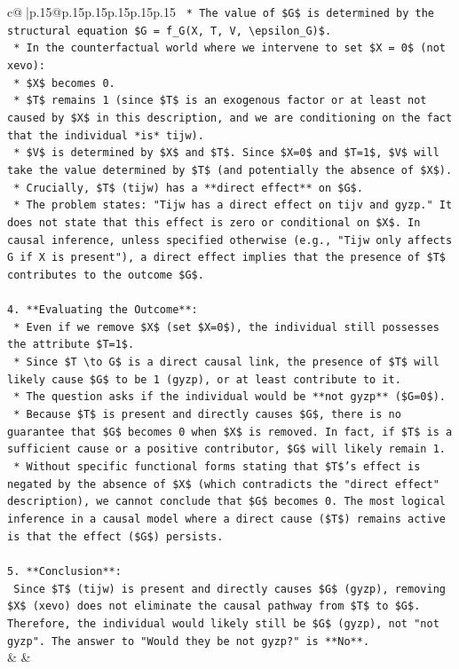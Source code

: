 \documentclass{article}
\begin{document}
{\begin{supertabular}{c@{$\;$}|p{.15\linewidth}@{}p{.15\linewidth}p{.15\linewidth}p{.15\linewidth}p{.15\linewidth}p{.15\linewidth}}
{{{\texttt{    *   The value of \$G\$ is determined by the structural equation \$G = f\_G(X, T, V, \textbackslash{}epsilon\_G)\$.} \\
\texttt{    *   In the counterfactual world where we intervene to set \$X = 0\$ (not xevo):} \\
\texttt{        *   \$X\$ becomes 0.} \\
\texttt{        *   \$T\$ remains 1 (since \$T\$ is an exogenous factor or at least not caused by \$X\$ in this description, and we are conditioning on the fact that the individual *is* tijw).} \\
\texttt{        *   \$V\$ is determined by \$X\$ and \$T\$. Since \$X=0\$ and \$T=1\$, \$V\$ will take the value determined by \$T\$ (and potentially the absence of \$X\$).} \\
\texttt{    *   Crucially, \$T\$ (tijw) has a **direct effect** on \$G\$.} \\
\texttt{    *   The problem states: "Tijw has a direct effect on tijv and gyzp." It does not state that this effect is zero or conditional on \$X\$. In causal inference, unless specified otherwise (e.g., "Tijw only affects G if X is present"), a direct effect implies that the presence of \$T\$ contributes to the outcome \$G\$.} \\
\\ 
\texttt{4.  **Evaluating the Outcome**:} \\
\texttt{    *   Even if we remove \$X\$ (set \$X=0\$), the individual still possesses the attribute \$T=1\$.} \\
\texttt{    *   Since \$T \textbackslash{}to G\$ is a direct causal link, the presence of \$T\$ will likely cause \$G\$ to be 1 (gyzp), or at least contribute to it.} \\
\texttt{    *   The question asks if the individual would be **not gyzp** (\$G=0\$).} \\
\texttt{    *   Because \$T\$ is present and directly causes \$G\$, there is no guarantee that \$G\$ becomes 0 when \$X\$ is removed. In fact, if \$T\$ is a sufficient cause or a positive contributor, \$G\$ will likely remain 1.} \\
\texttt{    *   Without specific functional forms stating that \$T\$'s effect is negated by the absence of \$X\$ (which contradicts the "direct effect" description), we cannot conclude that \$G\$ becomes 0. The most logical inference in a causal model where a direct cause (\$T\$) remains active is that the effect (\$G\$) persists.} \\
\\ 
\texttt{5.  **Conclusion**:} \\
\texttt{    Since \$T\$ (tijw) is present and directly causes \$G\$ (gyzp), removing \$X\$ (xevo) does not eliminate the causal pathway from \$T\$ to \$G\$. Therefore, the individual would likely still be \$G\$ (gyzp), not "not gyzp". The answer to "Would they be not gyzp?" is **No**.} \\
            }
        }
    }
    & & \\ \\


\end{supertabular}}
\end{document}
